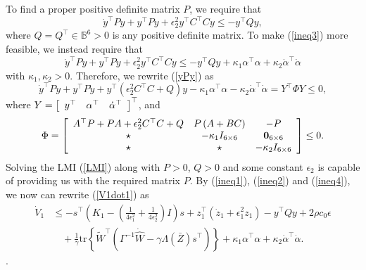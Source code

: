\documentclass{article}
\newcommand{\tr}{\text{tr}}
\begin{document}
	To find a proper positive definite matrix $P$, we require that
	\begin{equation}
	\dot{y}^{\top}Py + y^{\top}P\dot{y} + \epsilon_{2}^{2}y^{\top}C^{\top}Cy \leq -y^{\top}Qy, \label{ineq3}
	\end{equation}
	where $Q=Q^{\top}\in\mathbb{B}^{6}>0$ is any positive definite matrix. To make (\ref{ineq3}) more feasible, we instead require that
	\begin{equation}
	\dot{y}^{\top}Py + y^{\top}P\dot{y} + \epsilon_{2}^{2}y^{\top}C^{\top}Cy \leq -y^{\top}Qy + \kappa_{1}\alpha^{\top}\alpha + \kappa_{2}\dot{\alpha}^{\top}\dot{\alpha} \label{ineq4}
	\end{equation}
	with $\kappa_{1},\kappa_{2}>0$. Therefore, we rewrite (\ref{yPy}) as
	\begin{equation}
	\dot{y}^{\top}Py + y^{\top}P\dot{y} + y^{\top}\left(\epsilon_{2}^{2}C^{\top}C+Q\right)y- \kappa_{1}\alpha^{\top}\alpha - \kappa_{2}\dot{\alpha}^{\top}\dot{\alpha}= Y^{\top}\Phi Y \leq 0,
	\end{equation}
	where $Y = \left[
	\begin{array}[c]{ccc}
	y^{\top} & \alpha^{\top} & \dot{\alpha}^{\top}
	\end{array}
	\right]^{\top}$, and 
	\begin{align}
	\Phi = \left[
	\begin{array}[c]{ccc}
	A^{\top}P+PA+\epsilon_{2}^{2}C^{\top}C+Q & P\left(A+BC\right) & -P \\
	\star & -\kappa_{1}I_{6\times 6} & \textbf{0}_{6\times 6} \\
	\star & \star & -\kappa_{2}I_{6\times 6}
	\end{array}
	\right] \leq 0. \label{LMI}
	\end{align}
	Solving the LMI (\ref{LMI}) along with $P>0$, $Q>0$ and some constant $\epsilon_{2}$ is capable of providing us with the required matrix $P$. By (\ref{ineq1}), (\ref{ineq2}) and (\ref{ineq4}), we now can rewrite (\ref{V1dot1}) as
	\begin{align}
	\dot{V}_{1} & \leq -s^{\top}\left(K_{1}-\left(\frac{1}{4\epsilon_{1}^{2}}+\frac{1}{4\epsilon_{2}^{2}}\right)I\right)s + z_{1}^{\top}\left(\dot{z}_{1}+\epsilon_{1}^{2}z_{1}\right) - y^{\top}Qy + 2\rho c_{0}\epsilon \nonumber \\ 
	& \quad +\frac{1}{\gamma}\tr\left\{\tilde{W}^{\top}\left(\Gamma^{-1}\dot{\hat{W}}-\gamma\Lambda\left(\bar{Z}\right)s^{\top}\right)\right\} + \kappa_{1}\alpha^{\top}\alpha + \kappa_{2}\dot{\alpha}^{\top}\dot{\alpha}.
	\end{align}. \label{V1dot2}
	
\end{document}
